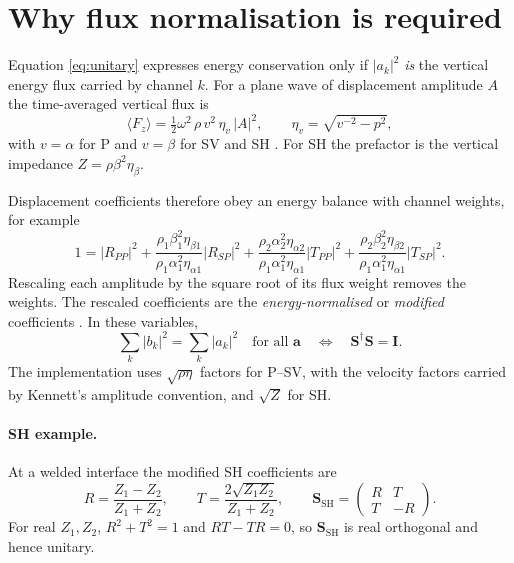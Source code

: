 \documentclass[11pt,a4paper]{article}
\newcommand{\bI}{\mathbf{I}}
\newcommand{\bS}{\mathbf{S}}
\newcommand{\ba}{\mathbf{a}}
\newcommand{\etas}{\eta_{\beta}}
\newcommand{\herm}{^{\dagger}}
\begin{document}
\section{Why flux normalisation is required}
\label{sec:flux}

Equation \eqref{eq:unitary} expresses energy conservation only if
$|a_k|^2$ \emph{is} the vertical energy flux carried by channel $k$.
For a plane wave of displacement amplitude $A$ the time-averaged
vertical flux is
\begin{equation}
  \langle F_z \rangle =
  \tfrac12 \omega^2 \, \rho \, v^2 \, \eta_v \, |A|^2,
  \qquad
  \eta_v = \sqrt{v^{-2} - p^2},
  \label{eq:flux}
\end{equation}
with $v = \alpha$ for P and $v = \beta$ for SV and SH
\citep[ch.~5]{AkiRichards2002}. For SH the prefactor is the vertical
impedance $Z = \rho\beta^2\etas$.

Displacement coefficients therefore obey an energy balance with
channel weights, for example
\begin{equation}
  1 = |R_{PP}|^2
    + \frac{\rho_1\beta_1^2\eta_{\beta1}}{\rho_1\alpha_1^2\eta_{\alpha1}}|R_{SP}|^2
    + \frac{\rho_2\alpha_2^2\eta_{\alpha2}}{\rho_1\alpha_1^2\eta_{\alpha1}}|T_{PP}|^2
    + \frac{\rho_2\beta_2^2\eta_{\beta2}}{\rho_1\alpha_1^2\eta_{\alpha1}}|T_{SP}|^2 .
  \label{eq:weighted}
\end{equation}
Rescaling each amplitude by the square root of its flux weight removes
the weights. The rescaled coefficients are the \emph{energy-normalised}
or \emph{modified} coefficients
\citep{Frasier1970,KennettKerry1979,Chapman2004}. In these variables,
\begin{equation}
  \sum_k |b_k|^2 = \sum_k |a_k|^2 \quad \text{for all } \ba
  \quad\Longleftrightarrow\quad
  \bS\herm\bS = \bI .
  \label{eq:equiv}
\end{equation}
The implementation uses $\sqrt{\rho\eta}$ factors for P--SV, with the
velocity factors carried by Kennett's amplitude convention, and
$\sqrt{Z}$ for SH.

\paragraph{SH example.} At a welded interface the modified SH
coefficients are
\begin{equation}
  R = \frac{Z_1 - Z_2}{Z_1 + Z_2}, \qquad
  T = \frac{2\sqrt{Z_1 Z_2}}{Z_1 + Z_2}, \qquad
  \bS_{\mathrm{SH}} =
  \begin{pmatrix} R & T \\ T & -R \end{pmatrix}.
  \label{eq:sh}
\end{equation}
For real $Z_1, Z_2$, $R^2 + T^2 = 1$ and $RT - TR = 0$, so
$\bS_{\mathrm{SH}}$ is real orthogonal and hence unitary.
\end{document}
